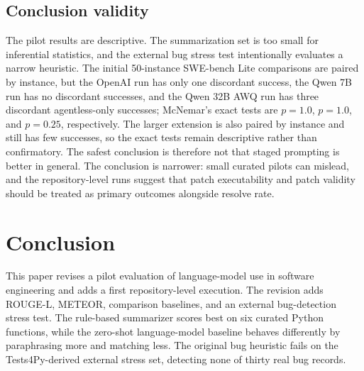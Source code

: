 \documentclass[preprint,12pt]{elsarticle}
\begin{document}
\subsection{Conclusion validity}

The pilot results are descriptive. The summarization set is too small for inferential statistics, and the external bug stress test intentionally evaluates a narrow heuristic. The initial 50-instance SWE-bench Lite comparisons are paired by instance, but the OpenAI run has only one discordant success, the Qwen 7B run has no discordant successes, and the Qwen 32B AWQ run has three discordant agentless-only successes; McNemar's exact tests are $p = 1.0$, $p = 1.0$, and $p = 0.25$, respectively. The larger extension is also paired by instance and still has few successes, so the exact tests remain descriptive rather than confirmatory. The safest conclusion is therefore not that staged prompting is better in general. The conclusion is narrower: small curated pilots can mislead, and the repository-level runs suggest that patch executability and patch validity should be treated as primary outcomes alongside resolve rate.

\section{Conclusion}

This paper revises a pilot evaluation of language-model use in software engineering and adds a first repository-level execution. The revision adds ROUGE-L, METEOR, comparison baselines, and an external bug-detection stress test. The rule-based summarizer scores best on six curated Python functions, while the zero-shot language-model baseline behaves differently by paraphrasing more and matching less. The original bug heuristic fails on the Tests4Py-derived external stress set, detecting none of thirty real bug records.
\end{document}
